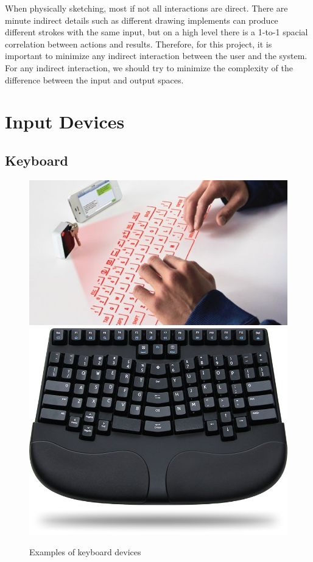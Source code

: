 \documentclass[11pt]{report}
\begin{document}
When physically sketching, most if not all interactions are direct. 
There are minute indirect details such as different drawing implements can produce different strokes with the same input, but on a high level there is a 1-to-1 spacial correlation between actions and results.
Therefore, for this project, it is important to minimize any indirect interaction between the user and the system.
For any indirect interaction, we should try to minimize the complexity of the difference between the input and output spaces.

\section{Input Devices}
\subsection{Keyboard}

\begin{figure}
\includegraphics[width=\textwidth]{virtual-keyboard}
\includegraphics[width=\textwidth]{ergonomickeyboard}
\caption{Examples of keyboard devices}
\end{figure}
\end{document}
